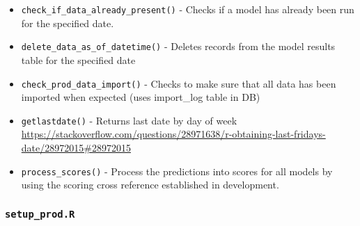\documentclass[
]{book}
\begin{document}
\begin{itemize}
\item
  \texttt{check\_if\_data\_already\_present()} - Checks if a model has already been run for the specified date.
\item
  \texttt{delete\_data\_as\_of\_datetime()} - Deletes records from the model results table for the specified date
\item
  \texttt{check\_prod\_data\_import()} - Checks to make sure that all data has been imported when expected (uses import\_log table in DB)
\item
  \texttt{getlastdate()} - Returns last date by day of week \url{https://stackoverflow.com/questions/28971638/r-obtaining-last-fridays-date/28972015\#28972015}
\item
  \texttt{process\_scores()} - Process the predictions into scores for all models by using the scoring cross reference established in development.
\end{itemize}

\hypertarget{setup_prod.r}{%
\subsubsection{\texorpdfstring{\texttt{setup\_prod.R}}{setup\_prod.R}}\label{setup_prod.r}}
\end{document}
